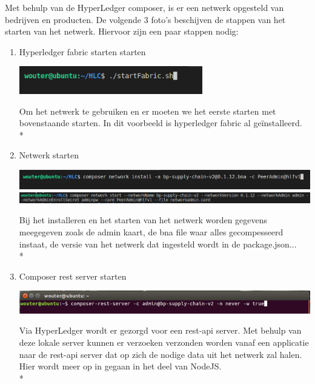 \documentclass[fleqn,a4paper,12pt]{book}
\begin{document}
Met behulp van de HyperLedger composer, is er een netwerk opgesteld van bedrijven en producten. De volgende 3 foto's beschijven de stappen van het starten van het netwerk.
Hiervoor zijn een paar stappen nodig:

\begin{enumerate}
	\item Hyperledger fabric starten starten
	\begin{center}
		\includegraphics[width=8cm]{img/start-fabric}\\[1cm]
	\end{center}
	Om het netwerk te gebruiken en er moeten we het eerste starten met bovenstaande starten. In dit voorbeeld is hyperledger fabric al geïnstalleerd.\\*
	\item Netwerk starten
	\begin{center}
		\includegraphics[width=13cm]{img/install-network}\\[1cm]
		\includegraphics[width=14cm]{img/start-network}\\[1cm]
	\end{center}
	Bij het installeren en het starten van het netwerk worden gegevens meegegeven zoals de admin kaart, de bna file waar alles gecompesseerd instaat, de versie van het netwerk dat ingesteld wordt in de package.json...\\*
	\item Composer rest server starten
	\begin{center}
		\includegraphics[width=13cm]{img/start-rest}\\[1cm]
	\end{center}
	Via HyperLedger wordt er gezorgd voor een rest-api server. Met behulp van deze lokale server kunnen er verzoeken verzonden worden vanaf een applicatie naar de rest-api server dat op zich de nodige data uit het netwerk zal halen. Hier wordt meer op in gegaan in het deel van NodeJS.\\*
\end{enumerate}
\end{document}
